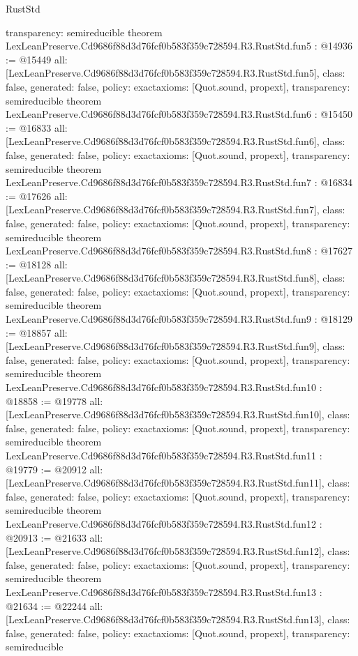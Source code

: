 \begin{lexlean}{RustStd}
\begin{coremodule}
{  transparency: semireducible
}
theorem LexLeanPreserve.Cd9686f88d3d76fcf0b583f359c728594.R3.RustStd.fun5 : @14936 := @15449 {
  all: [LexLeanPreserve.Cd9686f88d3d76fcf0b583f359c728594.R3.RustStd.fun5],
  class: false,
  generated: false,
  policy: exact{axioms: [Quot.sound, propext]},
  transparency: semireducible
}
theorem LexLeanPreserve.Cd9686f88d3d76fcf0b583f359c728594.R3.RustStd.fun6 : @15450 := @16833 {
  all: [LexLeanPreserve.Cd9686f88d3d76fcf0b583f359c728594.R3.RustStd.fun6],
  class: false,
  generated: false,
  policy: exact{axioms: [Quot.sound, propext]},
  transparency: semireducible
}
theorem LexLeanPreserve.Cd9686f88d3d76fcf0b583f359c728594.R3.RustStd.fun7 : @16834 := @17626 {
  all: [LexLeanPreserve.Cd9686f88d3d76fcf0b583f359c728594.R3.RustStd.fun7],
  class: false,
  generated: false,
  policy: exact{axioms: [Quot.sound, propext]},
  transparency: semireducible
}
theorem LexLeanPreserve.Cd9686f88d3d76fcf0b583f359c728594.R3.RustStd.fun8 : @17627 := @18128 {
  all: [LexLeanPreserve.Cd9686f88d3d76fcf0b583f359c728594.R3.RustStd.fun8],
  class: false,
  generated: false,
  policy: exact{axioms: [Quot.sound, propext]},
  transparency: semireducible
}
theorem LexLeanPreserve.Cd9686f88d3d76fcf0b583f359c728594.R3.RustStd.fun9 : @18129 := @18857 {
  all: [LexLeanPreserve.Cd9686f88d3d76fcf0b583f359c728594.R3.RustStd.fun9],
  class: false,
  generated: false,
  policy: exact{axioms: [Quot.sound, propext]},
  transparency: semireducible
}
theorem LexLeanPreserve.Cd9686f88d3d76fcf0b583f359c728594.R3.RustStd.fun10 : @18858 := @19778 {
  all: [LexLeanPreserve.Cd9686f88d3d76fcf0b583f359c728594.R3.RustStd.fun10],
  class: false,
  generated: false,
  policy: exact{axioms: [Quot.sound, propext]},
  transparency: semireducible
}
theorem LexLeanPreserve.Cd9686f88d3d76fcf0b583f359c728594.R3.RustStd.fun11 : @19779 := @20912 {
  all: [LexLeanPreserve.Cd9686f88d3d76fcf0b583f359c728594.R3.RustStd.fun11],
  class: false,
  generated: false,
  policy: exact{axioms: [Quot.sound, propext]},
  transparency: semireducible
}
theorem LexLeanPreserve.Cd9686f88d3d76fcf0b583f359c728594.R3.RustStd.fun12 : @20913 := @21633 {
  all: [LexLeanPreserve.Cd9686f88d3d76fcf0b583f359c728594.R3.RustStd.fun12],
  class: false,
  generated: false,
  policy: exact{axioms: [Quot.sound, propext]},
  transparency: semireducible
}
theorem LexLeanPreserve.Cd9686f88d3d76fcf0b583f359c728594.R3.RustStd.fun13 : @21634 := @22244 {
  all: [LexLeanPreserve.Cd9686f88d3d76fcf0b583f359c728594.R3.RustStd.fun13],
  class: false,
  generated: false,
  policy: exact{axioms: [Quot.sound, propext]},
  transparency: semireducible
}
\end{coremodule}
\end{lexlean}
